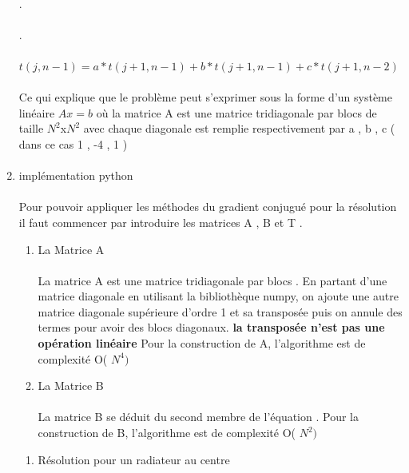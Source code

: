 \documentclass{article}
\begin{document}
\begin{enumerate}
    \paragraph{}
    .
    \paragraph{} 
    .
    \paragraph{}
   	
   $t(j,n-1) = a*t(j+1 , n-1) + b*t(j+1,n-1) + c*t(j+1,n-2)$ 
   
   \paragraph{} 
   Ce qui explique que le problème peut s'exprimer sous la forme d'un 
   système linéaire $Ax=b$ où la matrice A est une matrice tridiagonale par blocs 
   de taille $N^2$x$N^2$ avec chaque diagonale est remplie respectivement par a , b , c ( dans ce cas 1 , -4 , 1 )  
   \paragraph{}
   \item{implémentation python} 
 	\paragraph{} 
 	Pour pouvoir appliquer les méthodes du gradient conjugué pour la résolution il 
   faut commencer par introduire les matrices A , B et T . 
 	\begin{enumerate}
 		\item { La Matrice A } 
 		\paragraph{}
 		La matrice A est une matrice tridiagonale par blocs . 
     En partant d'une matrice diagonale en utilisant la bibliothèque numpy, 
     on ajoute une autre matrice diagonale supérieure d'ordre 1 et sa transposée 
     puis on annule des termes pour avoir des blocs diagonaux.
 		\textbf{ la transposée n'est pas une opération linéaire } 
 		Pour la construction de A, l'algorithme est de complexité O( $N^4)$ 
 		\item{La Matrice B} 
 		\paragraph{}
 		La matrice B se déduit du second membre de l'équation . 
 		Pour la construction de B, l'algorithme est de complexité O( $N^2)$   
 	\end{enumerate}
   \begin{enumerate} 
   	\item { Résolution pour un radiateur au centre }  
   	   

\end{enumerate}
\end{enumerate}
\end{document}
